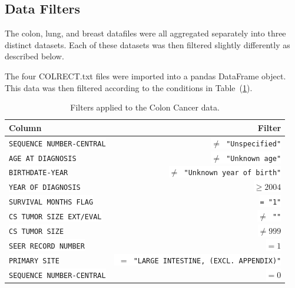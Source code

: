 \documentclass[a4paper,11pt]{article}
\newcommand{\codewhite}[1]{\colorbox{white}{\texttt{#1}}}
\begin{document}

\subsection{Data Filters}
\label{subsect:datafilters}

The colon, lung, and breast datafiles were all aggregated separately into three distinct datasets. 
Each of these datasets was then filtered slightly differently as described below.


 The four COLRECT.txt files were imported into a pandas DataFrame object.
This data was then filtered according to the conditions in Table~(\ref{tab:colonfilter}).






\begin{table}[tbp]
\begin{center}
\begin{tabular}{lr}
\toprule
 Column &  Filter \\
\midrule
\codewhite{SEQUENCE NUMBER-CENTRAL} & \codewhite{$\neq$ "Unspecified"} \\
\codewhite{AGE AT DIAGNOSIS} & \codewhite{$\neq$ "Unknown age"} \\
\codewhite{BIRTHDATE-YEAR} & \codewhite{$\neq$ "Unknown year of birth"} \\
\codewhite{YEAR OF DIAGNOSIS} & \codewhite{$\geq 2004$} \\
\codewhite{SURVIVAL MONTHS FLAG} & \codewhite{= "1"}\\
\codewhite{CS TUMOR SIZE EXT/EVAL} & \codewhite{$\neq$ ""} \\
\codewhite{CS TUMOR SIZE} & \codewhite{$\neq 999$} \\
\codewhite{SEER RECORD NUMBER} & \codewhite{$= 1$} \\
\codewhite{PRIMARY SITE} & \codewhite{ $=$ "LARGE INTESTINE, (EXCL. APPENDIX)"} \\
\codewhite{SEQUENCE NUMBER-CENTRAL} & \codewhite{$=0$} \\
\bottomrule
\end{tabular}
\caption{\label{tab:colonfilter} Filters applied to the Colon Cancer data.}
\end{center}
\end{table}
\end{document}
